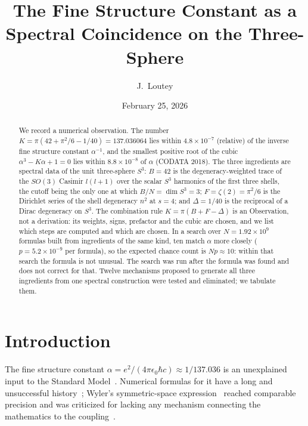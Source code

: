 \documentclass[aps,prl,twocolumn,superscriptaddress]{revtex4-2}
\begin{document}
\title{The Fine Structure Constant as a Spectral Coincidence on the Three-Sphere}

\author{J.~Loutey}

\date{February 25, 2026}

\begin{abstract}
We record a numerical observation. The number
$K = \pi(42 + \pi^2/6 - 1/40) = 137.036064$ lies within
$4.8\times10^{-7}$ (relative) of the inverse fine structure constant
$\alpha^{-1}$, and the smallest positive root of the cubic
$\alpha^3 - K\alpha + 1 = 0$ lies within $8.8\times10^{-8}$ of $\alpha$
(CODATA 2018). The three ingredients are spectral data of the unit
three-sphere $S^3$: $B = 42$ is the degeneracy-weighted trace of the
$SO(3)$ Casimir $l(l+1)$ over the scalar $S^3$ harmonics of the first
three shells, the cutoff being the only one at which $B/N = \dim S^3 = 3$;
$F = \zeta(2) = \pi^2/6$ is the Dirichlet series of the shell degeneracy
$n^2$ at $s = 4$; and $\Delta = 1/40$ is the reciprocal of a Dirac
degeneracy on $S^3$. The combination rule $K = \pi(B + F - \Delta)$ is an
Observation, not a derivation: its weights, signs, prefactor and the
cubic are chosen, and we list which steps are computed and which are
chosen. In a search over $N = 1.92\times10^9$ formulas built from
ingredients of the same kind, ten match $\alpha$ more closely
($p = 5.2\times10^{-9}$ per formula), so the expected chance count is
$Np \approx 10$: within that search the formula is not unusual. The
search was run after the formula was found and does not correct for
that. Twelve mechanisms proposed to generate all three ingredients from
one spectral construction were tested and eliminated; we tabulate them.
\end{abstract}

\maketitle

\section{Introduction}

The fine structure constant $\alpha = e^2/(4\pi\epsilon_0\hbar c)
\approx 1/137.036$ is an unexplained input to the Standard
Model~\cite{feynman1985}. Numerical formulas for it have a long and
unsuccessful history~\cite{eddington1935,barrow2002}; Wyler's
symmetric-space expression~\cite{wyler1969} reached comparable
precision and was criticized for lacking any mechanism connecting the
mathematics to the coupling~\cite{robertson1971}.
\end{document}
